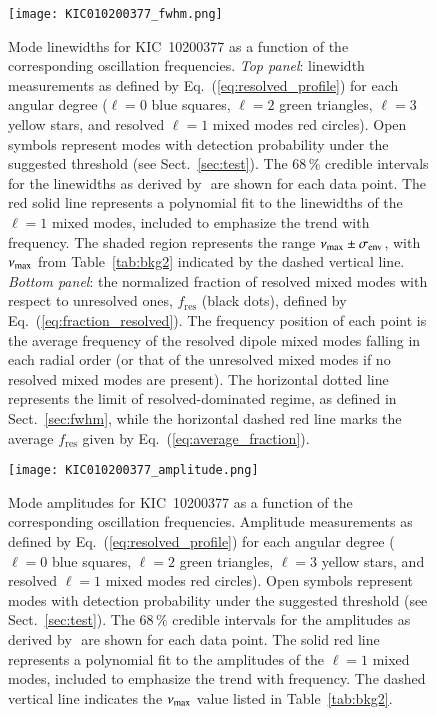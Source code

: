\begin{figure}
   \centering
   \texttt{[image: KIC010200377\_fwhm.png]}
      \caption{Mode linewidths for KIC~10200377 as a function of the corresponding oscillation frequencies. \textit{Top panel}: linewidth measurements as defined by Eq.~(\ref{eq:resolved_profile}) for each angular degree ($\ell = 0$ blue squares, $\ell = 2$ green triangles, $\ell = 3$ yellow stars, and resolved $\ell = 1$ mixed modes red circles). Open symbols represent modes with detection probability under the suggested threshold (see Sect.~\ref{sec:test}). The 68\,\% credible intervals for the linewidths as derived by \diamonds\,\,are shown for each data point. The red solid line represents a polynomial fit to the linewidths of the $\ell = 1$ mixed modes, included to emphasize the trend with frequency. The shaded region represents the range $\nu_\mathrm{max} \pm \sigma_\mathrm{env}$, with $\nu_\mathrm{max}$ from Table~\ref{tab:bkg2} indicated by the dashed vertical line. \textit{Bottom panel}: the normalized fraction of resolved mixed modes with respect to unresolved ones, $f_\mathrm{res}$ (black dots), defined by Eq.~(\ref{eq:fraction_resolved}). The frequency position of each point is the average frequency of the resolved dipole mixed modes falling in each radial order (or that of the unresolved mixed modes if no resolved mixed modes are present). The horizontal dotted line represents the limit of resolved-dominated regime, as defined in Sect.~\ref{sec:fwhm}, while the horizontal dashed red line marks the average $f_\mathrm{res}$ given by Eq.~(\ref{eq:average_fraction}).}
    \label{fig:10200377fwhm}
\end{figure}


\begin{figure}
   \centering
   \texttt{[image: KIC010200377\_amplitude.png]}
      \caption{Mode amplitudes for KIC~10200377 as a function of the corresponding oscillation frequencies. Amplitude measurements as defined by Eq.~(\ref{eq:resolved_profile}) for each angular degree ($\ell = 0$ blue squares, $\ell = 2$ green triangles, $\ell = 3$ yellow stars, and resolved $\ell = 1$ mixed modes red circles). Open symbols represent modes with detection probability under the suggested threshold (see Sect.~\ref{sec:test}). The 68\,\% credible intervals for the amplitudes as derived by \diamonds\,\,are shown for each data point. The solid red line represents a polynomial fit to the amplitudes of the $\ell = 1$ mixed modes, included to emphasize the trend with frequency. The dashed vertical line indicates the $\nu_\mathrm{max}$ value listed in Table~\ref{tab:bkg2}.}
    \label{fig:10200377amplitude}
\end{figure}
\clearpage


